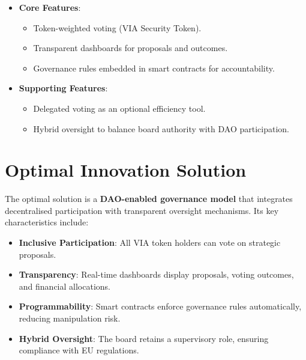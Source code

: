 \documentclass[
  english,
  12pt,
  oneside,
  open=any]{scrbook}
\providecommand{\tightlist}{%
  \setlength{\itemsep}{0pt}\setlength{\parskip}{0pt}}\usepackage{longtable,booktabs,array}
\begin{document}
\begin{itemize}
\tightlist
\item
  \textbf{Core Features}:

  \begin{itemize}
  \tightlist
  \item
    Token-weighted voting (VIA Security Token).\\
  \item
    Transparent dashboards for proposals and outcomes.\\
  \item
    Governance rules embedded in smart contracts for accountability.
  \end{itemize}
\item
  \textbf{Supporting Features}:

  \begin{itemize}
  \tightlist
  \item
    Delegated voting as an optional efficiency tool.\\
  \item
    Hybrid oversight to balance board authority with DAO participation.
  \end{itemize}
\end{itemize}

\section{Optimal Innovation Solution}\label{sec-optimal}

The optimal solution is a \textbf{DAO-enabled governance model} that
integrates decentralised participation with transparent oversight
mechanisms. Its key characteristics include:

\begin{itemize}
\tightlist
\item
  \textbf{Inclusive Participation}: All VIA token holders can vote on
  strategic proposals.\\
\item
  \textbf{Transparency}: Real-time dashboards display proposals, voting
  outcomes, and financial allocations.\\
\item
  \textbf{Programmability}: Smart contracts enforce governance rules
  automatically, reducing manipulation risk.\\
\item
  \textbf{Hybrid Oversight}: The board retains a supervisory role,
  ensuring compliance with EU regulations.
\end{itemize}
\end{document}
